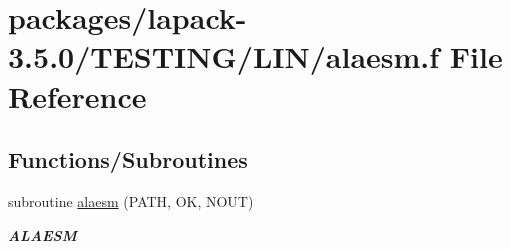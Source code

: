 \hypertarget{alaesm_8f}{}\section{packages/lapack-\/3.5.0/\+T\+E\+S\+T\+I\+N\+G/\+L\+I\+N/alaesm.f File Reference}
\label{alaesm_8f}
\subsection*{Functions/\+Subroutines}
\begin{DoxyCompactItemize}
\item 
subroutine \hyperlink{group__aux__lin_ga7e95a0425b51195944be2389d11469c9}{alaesm} (P\+A\+T\+H, O\+K, N\+O\+U\+T)
\begin{DoxyCompactList}\small\item\em {\bfseries A\+L\+A\+E\+S\+M} \end{DoxyCompactList}\end{DoxyCompactItemize}
